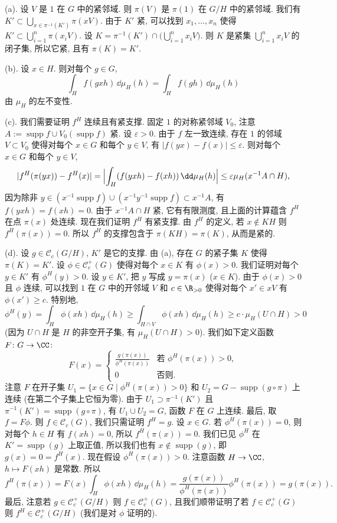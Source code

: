 \begin{solution}
(a). 设 $V$ 是 $1$ 在 $G$ 中的紧邻域. 则 $\pi(V)$ 是 $\pi(1)$ 在 $G/H$ 中的紧邻域. 我们有 $K' \subset \bigcup_{x \in \pi^{-1}(K')}\pi(xV)$. 由于 $K'$ 紧, 可以找到 $x_1, \ldots, x_n$ 使得 $K' \subset \bigcup_{i=1}^n\pi(x_iV)$. 设 $K = \pi^{-1}(K') \cap \bigl(\bigcup_{i=1}^n x_iV\bigr)$. 则 $K$ 是紧集 $\bigcup_{i=1}^n x_iV$ 的闭子集, 所以它紧, 且有 $\pi(K) = K'$.

(b). 设 $x \in H$. 则对每个 $g \in G$,
\[
\int_H f(gxh)\,\dd\mu_H(h) = \int_H f(gh)\,\dd\mu_H(h)
\]
由 $\mu_H$ 的左不变性.

(c). 我们需要证明 $f^H$ 连续且有紧支撑.
固定 $1$ 的对称紧邻域 $V_0$, 注意 $A := \operatorname{supp} f \cup V_0(\operatorname{supp} f)$ 紧. 设 $\varepsilon > 0$. 由于 $f$ 左一致连续, 存在 $1$ 的邻域 $V \subset V_0$ 使得对每个 $x \in G$ 和每个 $y \in V$, 有 $|f(yx) - f(x)| \leq \varepsilon$. 则对每个 $x \in G$ 和每个 $y \in V$,
\[
|f^H(\pi(yx)) - f^H(x)| = \Bigl|\int_H (f(yxh) - f(xh))\,\dd\mu_H(h)\Bigr| \leq \varepsilon\mu_H(x^{-1}A \cap H),
\]
因为除非 $y \in (x^{-1}\operatorname{supp} f) \cup (x^{-1}y^{-1}\operatorname{supp} f) \subset x^{-1}A$, 有 $f(yxh) = f(xh) = 0$. 由于 $x^{-1}A \cap H$ 紧, 它有有限测度, 且上面的计算蕴含 $f^H$ 在点 $\pi(x)$ 处连续.
现在我们证明 $f^H$ 有紧支撑. 由 $f^H$ 的定义, 若 $x \notin KH$ 则 $f^H(\pi(x)) = 0$. 所以 $f^H$ 的支撑包含于 $\pi(KH) = \pi(K)$, 从而是紧的.

(d). 设 $g \in \mathcal{C}_c(G/H)$, $K'$ 是它的支撑. 由 (a), 存在 $G$ 的紧子集 $K$ 使得 $\pi(K) = K'$. 设 $\phi \in \mathcal{C}_c^+(G)$ 使得对每个 $x \in K$ 有 $\phi(x) > 0$. 我们证明对每个 $y \in K'$ 有 $\phi^H(y) > 0$. 设 $y \in K'$, 把 $y$ 写成 $y = \pi(x)$ ($x \in K$). 由于 $\phi(x) > 0$ 且 $\phi$ 连续, 可以找到 $1$ 在 $G$ 中的开邻域 $V$ 和 $c \in \R_{>0}$ 使得对每个 $x' \in xV$ 有 $\phi(x') \geq c$. 特别地,
\[
\phi^H(y) = \int_H \phi(xh)\,\dd\mu_H(h) \geq \int_{H \cap V}\phi(xh)\,\dd\mu_H(h) \geq c \cdot \mu_H(U \cap H) > 0
\]
(因为 $U \cap H$ 是 $H$ 的非空开子集, 有 $\mu_H(U \cap H) > 0$).
我们如下定义函数 $F \colon G \to \CC$:
\[
F(x) = \begin{cases} \frac{g(\pi(x))}{\phi^H(\pi(x))} & \text{若 } \phi^H(\pi(x)) > 0, \\ 0 & \text{否则}. \end{cases}
\]
注意 $F$ 在开子集 $U_1 = \{x \in G \mid \phi^H(\pi(x)) > 0\}$ 和 $U_2 = G - \operatorname{supp}(g \circ \pi)$ 上连续 (在第二个子集上它恒为零). 由于 $U_1 \supset \pi^{-1}(K')$ 且 $\pi^{-1}(K') = \operatorname{supp}(g \circ \pi)$, 有 $U_1 \cup U_2 = G$, 函数 $F$ 在 $G$ 上连续. 最后, 取 $f = F\phi$. 则 $f \in \mathcal{C}_c(G)$, 我们只需证明 $f^H = g$.
设 $x \in G$. 若 $\phi^H(\pi(x)) = 0$, 则对每个 $h \in H$ 有 $f(xh) = 0$, 所以 $f^H(\pi(x)) = 0$. 我们已见 $\phi^H$ 在 $K' = \operatorname{supp}(g)$ 上取正值, 所以我们也有 $x \notin \operatorname{supp}(g)$, 即 $g(x) = 0 = f^H(x)$. 现在假设 $\phi^H(\pi(x)) > 0$. 注意函数 $H \to \CC$, $h \longmapsto F(xh)$ 是常数. 所以
\[
f^H(\pi(x)) = F(x)\int_H \phi(xh)\,\dd\mu_H(h) = \frac{g(\pi(x))}{\phi^H(\pi(x))}\phi^H(\pi(x)) = g(\pi(x)).
\]
最后, 注意若 $g \in \mathcal{C}_c^+(G/H)$ 则 $f \in \mathcal{C}_c^+(G)$, 且我们顺带证明了若 $f \in \mathcal{C}_c^+(G)$ 则 $f^H \in \mathcal{C}_c^+(G/H)$ (我们是对 $\phi$ 证明的).


\end{solution}
